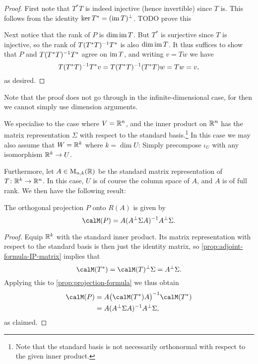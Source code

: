 \begin{proof}
    First note that $T^* T$ is indeed injective (hence invertible) since $T$ is. This follows from the identity $\ker T^* = (\operatorname{im} T)^\perp$. TODO prove this

    Next notice that the rank of $P$ is $\dim \operatorname{im} T$. But $T^*$ is surjective since $T$ is injective, so the rank of $T(T^* T)^{-1} T^*$ is also $\dim \operatorname{im} T$. It thus suffices to show that $P$ and $T(T^* T)^{-1} T^*$ agree on $\operatorname{im} T$, and writing $v = Tw$ we have
    \begin{equation*}
        T(T^* T)^{-1} T^* v
            = T(T^* T)^{-1} (T^* T) w
            = Tw
            = v,
    \end{equation*}
    as desired.
\end{proof}
%
Note that the proof does not go through in the infinite-dimensional case, for then we cannot simply use dimension arguments.

We specialise to the case where $V = \mathbb{R}^n$, and the inner product on $\mathbb{R}^n$ has the matrix representation $\Sigma$ with respect to the standard basis.\footnote{Note that the standard basis is not necessarily orthonormal with respect to the given inner product.} In this case we may also assume that $W = \mathbb{R}^k$ where $k = \dim U$: Simply precompose $\iota_U$ with any isomorphism $\mathbb{R}^k \to U$.

Furthermore, let $A \in \mathrm{M}_{n,k}(\mathbb{R})$ be the standard matrix representation of $T \colon \mathbb{R}^k \to \mathbb{R}^n$. In this case, $U$ is of course the column space of $A$, and $A$ is of full rank. We then have the following result:

\begin{proposition}
    The orthogonal projection $P$ onto $R(A)$ is given by
    \begin{equation*}
        \smr{P}
            = A\inv{(\trans{A} \Sigma A)} \trans{A} \Sigma.
    \end{equation*}
\end{proposition}

\begin{proof}
    Equip $\mathbb{R}^k$ with the standard inner product. Its matrix representation with respect to the standard basis is then just the identity matrix, so \cref{prop:adjoint-formula-IP-matrix} implies that
    \begin{equation*}
        \smr{T^*}
            = \trans{\smr{T}} \Sigma
            = \trans{A} \Sigma.
    \end{equation*}
    Applying this to \cref{prop:projection-formula} we thus obtain
    \begin{align*}
        \smr{P}
            &= A \inv{\bigl( \smr{T^*} A \bigr)} \smr{T^*} \\
            &= A \inv{(\trans{A} \Sigma A)} \trans{A} \Sigma,
    \end{align*}
    as claimed.
\end{proof}


